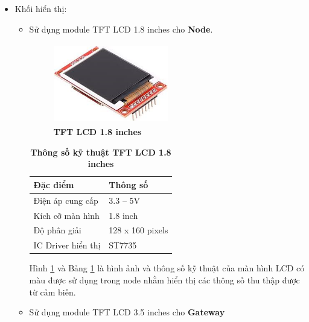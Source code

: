 \documentclass{article} %
\begin{document}
\begin{itemize}
\begin{itemize}[label=$\ast$]
			\item Khối hiển thị:
			\begin{itemize}
				\item[\ding{70}] Sử dụng module TFT LCD 1.8 inches cho \textbf{Node}.
				\begin{figure}[!ht]
					\centering
					\includegraphics[width=5cm,height=3.5cm]{Images/LCD1.8.png}
					\caption[TFT LCD 1.8 inches\cite{TFT1.8}]{\bfseries \fontsize{12pt}{0pt}\selectfont TFT LCD 1.8 inches\cite{TFT1.8}}
					\label{LCD1.8}
				\end{figure}
				\begin{table}[H]
					\centering
					\begin{tabular}{|l|l|}
						\hline
						Đặc điểm           & Thông số         \\ \hline
						Điện áp cung cấp   & 3.3 – 5V         \\ \hline
						Kích cỡ màn hình   & 1.8 inch         \\ \hline
						Độ phân giải       & 128 x 160 pixels \\ \hline
						IC Driver hiển thị & ST7735           \\ \hline
					\end{tabular}
					\caption[Thông số kỹ thuật TFT LCD 1.8 inches\cite{TFT1.8}]{\bfseries\fontsize{12pt}{0pt}\selectfont Thông số kỹ thuật TFT LCD 1.8 inches\cite{TFT1.8}}
					\label{ThongsoLCD1.8}
				\end{table}
				Hình \ref{LCD1.8} và Bảng \ref{ThongsoLCD1.8} là hình ảnh và thông số kỹ thuật của màn hình LCD có màu được sử dụng trong node nhằm hiển thị các thông số thu thập được từ cảm biến.
				\item[\ding{70}] Sử dụng module TFT LCD 3.5 inches cho \textbf{Gateway}
				

\end{itemize}
\end{itemize}
\end{itemize}
\end{document}
